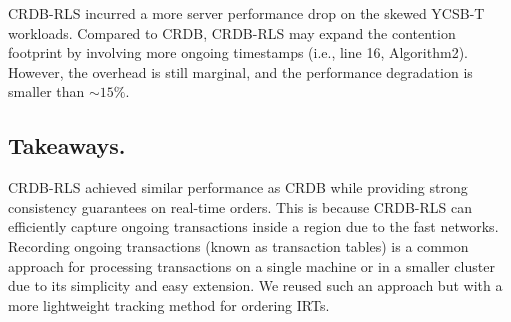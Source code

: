 CRDB-RLS incurred a more server performance drop on the skewed YCSB-T workloads. Compared to CRDB, CRDB-RLS may expand the contention footprint by involving more ongoing timestamps (i.e., line 16, Algorithm2). However, the overhead is still marginal, and the performance degradation is smaller than $\sim15\%$.





\subsection{Takeaways.} CRDB-RLS achieved similar performance as CRDB while providing strong consistency guarantees on real-time orders. This is because CRDB-RLS can efficiently capture ongoing transactions inside a region due to the fast networks. Recording ongoing transactions (known as transaction tables) is a common approach for processing transactions on a single machine or in a smaller cluster due to its simplicity and easy extension. We reused such an approach but with a more lightweight tracking method for ordering IRTs.